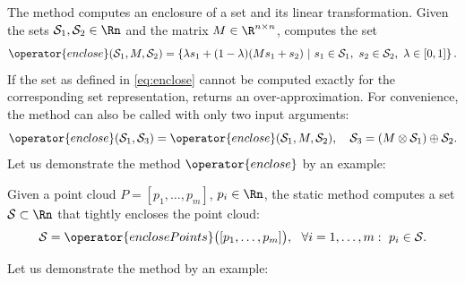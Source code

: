 The method  computes an enclosure of a set and its linear transformation. Given the sets $\mathcal{S}_1,\mathcal{S}_2 \in \Rn$ and the matrix $M \in \R^{n \times n}$,  computes the set
\begin{equation}
	\operator{enclose}(\mathcal{S}_1,M,\mathcal{S}_2) = \left \{ \lambda s_1 + (1-\lambda) (Ms_1 +s_2) ~|~ s_1 \in \mathcal{S}_1,~s_2 \in \mathcal{S}_2,~\lambda \in [0,1] \right\}.
	\label{eq:enclose}
\end{equation}
If the set as defined in \eqref{eq:enclose} cannot be computed exactly for the corresponding set representation,  returns an over-approximation. For convenience, the method can also be called with only two input arguments:
\begin{equation*}
	\operator{enclose}(\mathcal{S}_1,\mathcal{S}_3) = \operator{enclose}(\mathcal{S}_1,M,\mathcal{S}_2), ~~~ \mathcal{S}_3 = (M \otimes \mathcal{S}_1) \oplus \mathcal{S}_2.
\end{equation*}
Let us demonstrate the method $\operator{enclose}$ by an example:

\begin{center}
\begin{minipage}[t]{0.37\textwidth}
	\vspace{10pt}
	\footnotesize
	
\end{minipage}
\begin{minipage}[t]{0.6\textwidth}
	\vspace{0pt}
	\centering
\end{minipage}
\end{center}

\vspace{1cm}


Given a point cloud $P = [p_1,\dots,p_m]$, $p_i \in \Rn$, the static method  computes a set $\mathcal{S} \subset \Rn$ that tightly encloses the point cloud:
\begin{equation*}
	\mathcal{S} = \operator{enclosePoints}\big([p_1,\dots,p_m]\big), ~~ \forall i = 1,\dots,m: ~ p_i \in \mathcal{S}.
\end{equation*}

Let us demonstrate the method  by an example:

\begin{center}
\begin{minipage}[t]{0.50\textwidth}
	\vspace{10pt}
	\footnotesize
	
\end{minipage}
\begin{minipage}[t]{0.3\textwidth}
	\vspace{0pt}
	\centering
\end{minipage}
\end{center}

